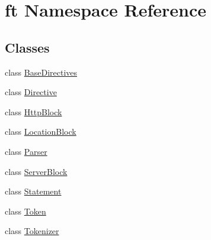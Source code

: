 \hypertarget{namespaceft}{}\section{ft Namespace Reference}
\label{namespaceft}
\subsection*{Classes}
\begin{DoxyCompactItemize}
\item 
class \hyperlink{classft_1_1_base_directives}{Base\+Directives}
\item 
class \hyperlink{classft_1_1_directive}{Directive}
\item 
class \hyperlink{classft_1_1_http_block}{Http\+Block}
\item 
class \hyperlink{classft_1_1_location_block}{Location\+Block}
\item 
class \hyperlink{classft_1_1_parser}{Parser}
\item 
class \hyperlink{classft_1_1_server_block}{Server\+Block}
\item 
class \hyperlink{classft_1_1_statement}{Statement}
\item 
class \hyperlink{classft_1_1_token}{Token}
\item 
class \hyperlink{classft_1_1_tokenizer}{Tokenizer}
\end{DoxyCompactItemize}
